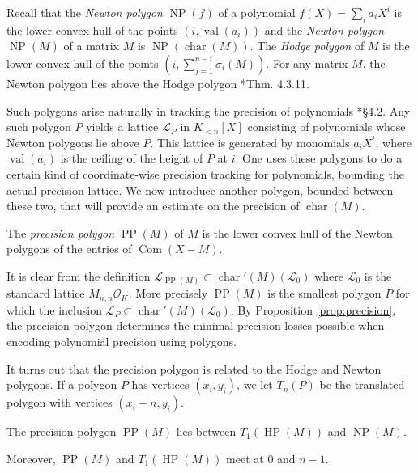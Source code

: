 \documentclass{sig-alternate}
\DeclareMathOperator{\NP}{NP}
\DeclareMathOperator{\HP}{HP}
\DeclareMathOperator{\PP}{PP}
\DeclareMathOperator{\val}{val}
\DeclareMathOperator{\com}{Com}
\newcommand{\OK}{\mathcal{O}_K}
\DeclareMathOperator{\charpoly}{char}
\newcommand{\charp}{\charpoly'}
\begin{document}
Recall that the \emph{Newton polygon} $\NP(f)$ of a polynomial $f(X) = 
\sum_{i} a_i X^i$ is the lower convex hull of the points $(i, 
\val(a_i))$ and the \emph{Newton polygon} $\NP(M)$ of a matrix $M$ is 
$\NP(\charpoly(M))$.  The \emph{Hodge polygon} of $M$ is the lower 
convex hull of the points $(i, \sum_{j = 1}^{n-i} \sigma_i(M))$. For 
any matrix $M$, the Newton polygon lies above the Hodge polygon 
\cite{kedlaya:padicDiffEq}*{Thm. 4.3.11}.

Such polygons arise naturally in tracking the precision of polynomials 
\cite{caruso-roe-vaccon:14a}*{\S 4.2}.  Any such polygon $P$ yields a 
lattice $\mathcal{L}_P$ in $K_{<n}[X]$ consisting of polynomials whose 
Newton polygons lie above $P$.  This lattice is generated by monomials 
$a_iX^i$, where $\val(a_i)$ is the ceiling of the height of $P$ at $i$.  
One uses these polygons to do a certain kind of coordinate-wise 
precision tracking for polynomials, bounding the actual precision 
lattice. We now introduce another polygon, bounded 
between these two, that will provide an estimate on the precision of $\charpoly(M)$.

\begin{deftn}
The \emph{precision polygon} $\PP(M)$ of $M$ is the lower convex hull of 
the Newton polygons of the entries of $\com(X{-}M)$.
\end{deftn}

It is clear from the definition $\mathcal L_{\PP(M)} \subset 
\charp(M)(\mathcal{L}_0)$ where $\mathcal{L}_0$ is the standard lattice 
$M_{n,n}{\OK}$. More precisely $\PP(M)$ is the smallest polygon $P$ for 
which the inclusion $\mathcal L_P \subset \charp(M)(\mathcal{L}_0)$. By 
Proposition \ref{prop:precision}, the precision polygon determines the minimal 
precision losses possible when encoding polynomial precision using polygons.

It turns out that the precision polygon is related to the Hodge and Newton 
polygons. If a polygon $P$ has vertices $(x_i, y_i)$, we let $T_n(P)$ be 
the translated polygon with vertices $(x_i - n, y_i)$.

\begin{prop} \label{prop:polygons}
The precision polygon $\PP(M)$ lies between $T_1(\HP(M))$
and $\NP(M)$.

Moreover, $\PP(M)$ and $T_1(\HP(M))$ meet at $0$ and $n{-}1$.
\end{prop}
\end{document}
